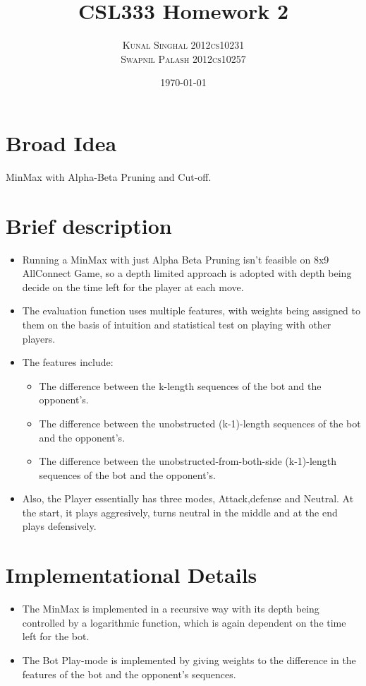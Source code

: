 \documentclass[10pt]{article}
\begin{document}
\title{CSL333 Homework 2}
\author{\textsc{Kunal Singhal 2012cs10231 } \\  \textsc{ Swapnil Palash 2012cs10257}}
\date{\today}
\maketitle

\section{Broad Idea} MinMax with Alpha-Beta Pruning and Cut-off.

\section{Brief description}
\begin{itemize}
\item Running a MinMax with just Alpha Beta Pruning isn't feasible on 8x9 AllConnect Game, so a depth limited approach is adopted with depth being decide on the time left for the player at each move.
\item The evaluation function uses multiple features, with weights being assigned to them on the basis of intuition and statistical test on playing with other players.
\item The features include:
\begin{itemize}
\item The difference between the k-length sequences of the bot and the opponent's.
\item The difference between the unobstructed (k-1)-length sequences of the bot and the opponent's.
\item The difference between the unobstructed-from-both-side (k-1)-length sequences of the bot and the opponent's.
\end{itemize}
\item Also, the Player essentially has three modes, Attack,defense and Neutral. At the start, it plays aggresively, turns neutral in the middle and at the end plays defensively. 
\end{itemize}

\section{Implementational Details} 
\begin{itemize}
\item The MinMax is implemented in a recursive way with its depth being controlled by a logarithmic function, which is again dependent on the time left for the bot.
\item The Bot Play-mode is implemented by giving weights to the difference in the features of the bot and the opponent's sequences.
\end{itemize}
\end{document}
